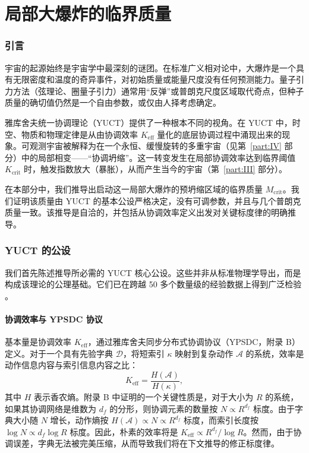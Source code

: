 \documentclass[11pt,a4paper]{article}
\newcommand{\Keff}{K_{\mathrm{eff}}}
\begin{document}
	\part{局部大爆炸的临界质量}
	\label{part:I}
	
	\section{引言}
	
	宇宙的起源始终是宇宙学中最深刻的谜团。在标准广义相对论中，大爆炸是一个具有无限密度和温度的奇异事件，对初始质量或能量尺度没有任何预测能力。量子引力方法（弦理论、圈量子引力）通常用“反弹”或普朗克尺度区域取代奇点，但种子质量的确切值仍然是一个自由参数，或仅由人择考虑确定。
	
	雅库舍夫统一协调理论（YUCT）提供了一种根本不同的视角。在 YUCT 中，时空、物质和物理定律是从由协调效率 \(K_{\mathrm{eff}}\) 量化的底层协调过程中涌现出来的现象。可观测宇宙被解释为在一个永恒、缓慢旋转的多重宇宙（见第~\ref{part:IV} 部分）中的局部相变——“协调坍缩”。这一转变发生在局部协调效率达到临界阈值 \(K_{\mathrm{crit}}\) 时，触发指数放大（暴胀），从而产生当今的宇宙（第~\ref{part:III} 部分）。
	
	在本部分中，我们推导出启动这一局部大爆炸的预坍缩区域的临界质量 \(M_{\mathrm{crit}}\)。我们证明该质量由 YUCT 的基本公设严格决定，没有可调参数，并且与几个普朗克质量一致。该推导是自洽的，并包括从协调效率定义出发对关键标度律的明确推导。
	
	\section{YUCT 的公设}
	
	我们首先陈述推导所必需的 YUCT 核心公设。这些并非从标准物理学导出，而是构成该理论的公理基础。它们已在跨越 50 多个数量级的经验数据上得到广泛检验 \cite{AppendixL}。
	
	\subsection{协调效率与 YPSDC 协议}
	
	基本量是协调效率 \(K_{\mathrm{eff}}\)，通过雅库舍夫同步分布式协调协议（YPSDC，附录 B）定义。对于一个具有先验字典 \(\mathcal{D}\)，将短索引 \(\kappa\) 映射到复杂动作 \(\mathcal{A}\) 的系统，效率是动作信息内容与索引信息内容之比：
	\begin{equation}
		\Keff = \frac{H(\mathcal{A})}{H(\kappa)},
		\label{eq:keff-def}
	\end{equation}
	其中 \(H\) 表示香农熵。附录 B 中证明的一个关键性质是，对于大小为 \(R\) 的系统，如果其协调网络是维数为 \(d_f\) 的分形，则协调元素的数量按 \(N \propto R^{d_f}\) 标度。由于字典大小随 \(N\) 增长，动作熵按 \(H(\mathcal{A}) \propto N \propto R^{d_f}\) 标度，而索引长度按 \(\log N \propto d_f \log R\) 标度。因此，朴素的效率将是 \(\Keff \propto R^{d_f} / \log R\)。然而，由于协调误差，字典无法被完美压缩，从而导致我们将在下文推导的修正标度律。
	
\end{document}

